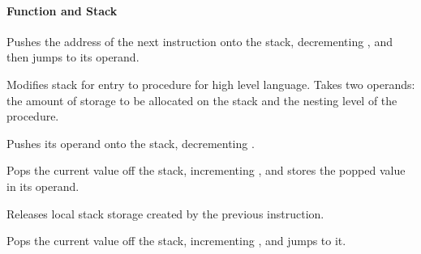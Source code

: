 \paragraph{Function and Stack}
\begin{description}[align=right, font=\keywordstyle]
  \item[call] Pushes the address of the next instruction onto the stack,
    decrementing \rsp, and then jumps to its operand.
  \item[enter] Modifies stack for entry to procedure
    for high level language. Takes two operands: the amount of storage to be allocated on the stack and the nesting level of the procedure.
  \item[push] Pushes its operand onto the stack,
    decrementing \rsp.
  \item[pop] Pops the current value off the stack,
    incrementing \rsp, and stores the popped value in its operand.
  \item[leave] Releases local stack storage created by the previous
     instruction.
  \item[ret] Pops the current value off the stack,
    incrementing \rsp, and jumps to it.
\end{description}

